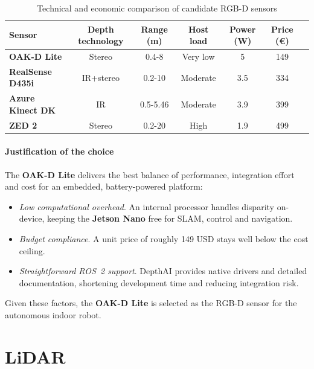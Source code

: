 \begin{table}[H]
  \centering
  \begin{tabular}{l c c c c c c}
    \toprule
    \textbf{Sensor}              &
    \textbf{Depth technology}    &
    \textbf{Range (\si{\metre})} &
    \textbf{Host load}           &
    \textbf{Power (\si{\watt})}  &
    \textbf{Price (\euro)}                                                     \\
    \midrule
    \textbf{OAK-D Lite}          & Stereo    & 0.4-8    & Very low & 5   & 149 \\
    \textbf{RealSense D435i}     & IR+stereo & 0.2-10   & Moderate & 3.5 & 334 \\
    \textbf{Azure Kinect DK}     & IR        & 0.5-5.46 & Moderate & 3.9 & 399 \\
    \textbf{ZED 2}               & Stereo    & 0.2-20   & High     & 1.9 & 499 \\
    \bottomrule
  \end{tabular}
  \caption{Technical and economic comparison of candidate RGB-D sensors}
  \label{tab:rgbd_comparison}
\end{table}

\paragraph*{Justification of the choice}
The \textbf{OAK-D Lite} delivers the best balance of performance, integration effort and cost for an embedded, battery-powered platform:

\begin{itemize}
  \item \textit{Low computational overhead}. An internal processor handles disparity on-device, keeping the \textbf{Jetson Nano} free for SLAM, control and navigation.
  \item \textit{Budget compliance}. A unit price of roughly 149 USD stays well below the cost ceiling.
  \item \textit{Straightforward ROS~2 support}. DepthAI provides native drivers and detailed documentation, shortening development time and reducing integration risk.
\end{itemize}

Given these factors, the \textbf{OAK-D Lite} is selected as the RGB-D sensor for the autonomous indoor robot.
\section{LiDAR}\label{subsec:lidar_selection}

